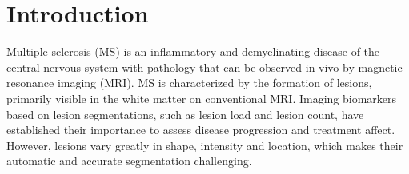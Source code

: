 \section{Introduction}

Multiple sclerosis (MS) is an inflammatory and demyelinating disease of the
central nervous system with pathology that can be observed in vivo by magnetic
resonance imaging (MRI). MS is characterized by the formation of lesions,
primarily visible in the white matter on conventional MRI. Imaging biomarkers
based on lesion segmentations, such as lesion load and lesion count, have
established their importance to assess disease progression and treatment affect.
However, lesions vary greatly in shape, intensity and location, which makes
their automatic and accurate segmentation challenging.



